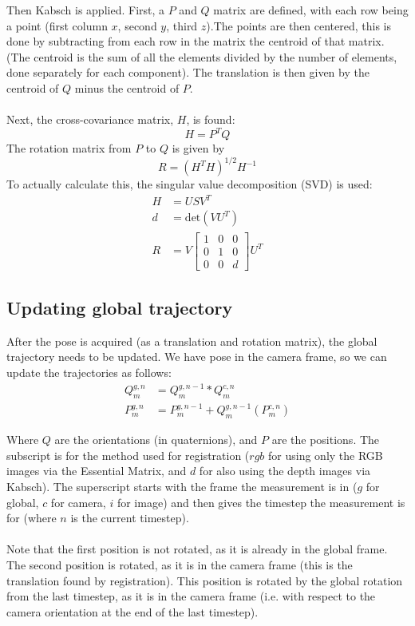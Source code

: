 \documentclass[12pt,a4paper]{article}
\begin{document}
Then Kabsch is applied. First, a $P$ and $Q$ matrix are defined, with each row being a point (first column $x$, second $y$, third $z$).The points are then centered, this is done by subtracting from each row in the matrix the centroid of that matrix. (The centroid is the sum of all the elements divided by the number of elements, done separately for each component). The translation is then given by the centroid of $Q$ minus the centroid of $P$.
\\\\
Next, the cross-covariance matrix, $H$, is found:
\[
H = P^T Q
\]
The rotation matrix from $P$ to $Q$ is given by 
\[
R = (H^TH)^{1/2}H^{-1}
\]
To actually calculate this, the singular value decomposition (SVD) is used:
\begin{align*}
H &= USV^T \\
d &= \text{det}(VU^T) \\
R &= V \begin{bmatrix} 1 & 0 & 0 \\ 0 & 1 & 0 \\ 0 & 0 & d \end{bmatrix} U^T
\end{align*}

\subsection{Updating global trajectory}
After the pose is acquired (as a translation and rotation matrix), the global trajectory needs to be updated. We have pose in the camera frame, so we can update the trajectories as follows:
\begin{align*}
Q_{m}^{g,n} &= Q_{m}^{g,n-1} * Q_{m}^{c,n} \\
P_{m}^{g,n} &= P_{m}^{g,n-1} + Q_{m}^{g,n-1}(P_{m}^{c,n})
\end{align*}

\noindent
Where $Q$ are the orientations (in quaternions), and $P$ are the positions. The subscript is for the method used for registration ($rgb$ for using only the RGB images via the Essential Matrix, and $d$ for also using the depth images via Kabsch). The superscript starts with the frame the measurement is in ($g$ for global, $c$ for camera, $i$ for image) and then gives the timestep the measurement is for (where $n$ is the current timestep).
\\\\
Note that the first position is not rotated, as it is already in the global frame. The second position is rotated, as it is in the camera frame (this is the translation found by registration). This position is rotated by the global rotation from the last timestep, as it is in the camera frame (i.e. with respect to the camera orientation at the end of the last timestep).
\end{document}

